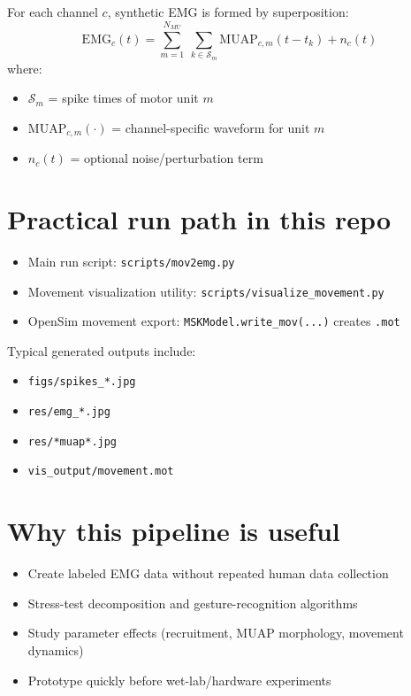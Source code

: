 \documentclass[11pt,a4paper]{article}
\begin{document}
For each channel $c$, synthetic EMG is formed by superposition:
\[
\mathrm{EMG}_c(t) = \sum_{m=1}^{N_{MU}}\ \sum_{k\in\mathcal{S}_m} \mathrm{MUAP}_{c,m}(t-t_k) + n_c(t)
\]
where:
\begin{itemize}
    \item $\mathcal{S}_m$ = spike times of motor unit $m$
    \item $\mathrm{MUAP}_{c,m}(\cdot)$ = channel-specific waveform for unit $m$
    \item $n_c(t)$ = optional noise/perturbation term
\end{itemize}

\section{Practical run path in this repo}

\begin{itemize}
    \item Main run script: \texttt{scripts/mov2emg.py}
    \item Movement visualization utility: \texttt{scripts/visualize\_movement.py}
    \item OpenSim movement export: \texttt{MSKModel.write\_mov(...)} creates \texttt{.mot}
\end{itemize}

Typical generated outputs include:
\begin{itemize}
    \item \texttt{figs/spikes\_*.jpg}
    \item \texttt{res/emg\_*.jpg}
    \item \texttt{res/*muap*.jpg}
    \item \texttt{vis\_output/movement.mot}
\end{itemize}

\section{Why this pipeline is useful}

\begin{itemize}
    \item Create labeled EMG data without repeated human data collection
    \item Stress-test decomposition and gesture-recognition algorithms
    \item Study parameter effects (recruitment, MUAP morphology, movement dynamics)
    \item Prototype quickly before wet-lab/hardware experiments
\end{itemize}
\end{document}
